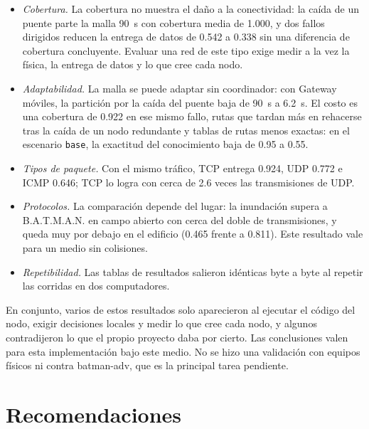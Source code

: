 \begin{itemize}
\item \textit{Cobertura.} La cobertura no muestra el daño a la conectividad:
la caída de un puente parte la malla 90~s con cobertura media de 1.000, y dos
fallos dirigidos reducen la entrega de datos de 0.542 a 0.338 sin una
diferencia de cobertura concluyente. Evaluar una red de este tipo exige medir
a la vez la física, la entrega de datos y lo que cree cada nodo.
\item \textit{Adaptabilidad.} La malla se puede adaptar sin coordinador: con
Gateway móviles, la partición por la caída del puente baja de 90~s a 6.2~s. El
costo es una cobertura de 0.922 en ese mismo fallo, rutas que tardan más en
rehacerse tras la caída de un nodo redundante y tablas de rutas menos exactas:
en el escenario \texttt{base}, la exactitud del conocimiento baja de 0.95 a
0.55.
\item \textit{Tipos de paquete.} Con el mismo tráfico, TCP entrega 0.924, UDP
0.772 e ICMP 0.646; TCP lo logra con cerca de 2.6 veces las transmisiones de
UDP.
\item \textit{Protocolos.} La comparación depende del lugar: la inundación
supera a B.A.T.M.A.N. en campo abierto con cerca del doble de transmisiones, y
queda muy por debajo en el edificio (0.465 frente a 0.811). Este resultado vale
para un medio sin colisiones.
\item \textit{Repetibilidad.} Las tablas de resultados salieron idénticas byte
a byte al repetir las corridas en dos computadores.
\end{itemize}

En conjunto, varios de estos resultados solo aparecieron al ejecutar el código
del nodo, exigir decisiones locales y medir lo que cree cada nodo, y algunos
contradijeron lo que el propio proyecto daba por cierto. Las conclusiones valen
para esta implementación bajo este medio. No se hizo una validación con equipos
físicos ni contra batman-adv, que es la principal tarea pendiente.

\section{Recomendaciones}
\label{sec:recomendaciones}

